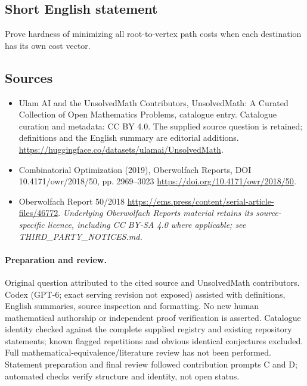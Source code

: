 \documentclass[11pt]{article}
\begin{document}
\subsection{Short English statement}
Prove hardness of minimizing all root-to-vertex path costs when each destination has its own cost vector.
\subsection{Sources}
\begin{itemize}
\item[\hypertarget{source:statement:1}{S1}] Ulam AI and the UnsolvedMath Contributors, UnsolvedMath: A Curated Collection of Open Mathematics Problems, catalogue entry. Catalogue curation and metadata: CC BY 4.0. The supplied source question is retained; definitions and the English summary are editorial additions.
\url{https://huggingface.co/datasets/ulamai/UnsolvedMath}.
\item[\hypertarget{source:statement:2}{S2}] Combinatorial Optimization (2019), Oberwolfach Reports, DOI 10.4171/owr/2018/50, pp. 2969--3023
\url{https://doi.org/10.4171/owr/2018/50}.
\item[\hypertarget{source:statement:3}{S3}] Oberwolfach Report 50/2018
\url{https://ems.press/content/serial-article-files/46772}.
\textit{Underlying Oberwolfach Reports material retains its source-specific licence, including CC BY-SA 4.0 where applicable; see THIRD\_PARTY\_NOTICES.md.}
\end{itemize}
\paragraph{Preparation and review.}
Original question attributed to the cited source and UnsolvedMath contributors. Codex (GPT-6; exact serving revision not exposed) assisted with definitions, English summaries, source inspection and formatting. No new human mathematical authorship or independent proof verification is asserted. Catalogue identity checked against the complete supplied registry and existing repository statements; known flagged repetitions and obvious identical conjectures excluded. Full mathematical-equivalence/literature review has not been performed. Statement preparation and final review followed contribution prompts C and D; automated checks verify structure and identity, not open status.
\label{end:statement}
\end{document}
